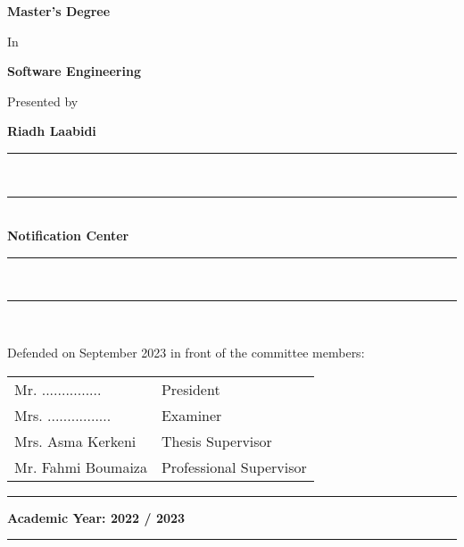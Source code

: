 \begin{titlepage}
\begin{center}
        \Large\textbf{Master's Degree}

        \normalsize In

        \Large\textbf{Software Engineering}

        \normalsize Presented by

        \large{\textbf{Riadh Laabidi}}
        \vspace{0.5cm}

        \rule[5pt]{0.5\textwidth}{0.5px}\\
        \vspace{-16px}
        \rule[10pt]{0.5\textwidth}{2.5px} \\
        \LARGE{\textbf{Notification Center}} \\
        \rule[5pt]{0.5\textwidth}{0.5px}\\
        \vspace{-15px}
        \rule[10pt]{0.5\textwidth}{2.5px} \\


        \vspace{1cm}

        \small Defended on September 2023 in front of the committee members:

        \renewcommand\arraystretch{1}
        \begin{tabular}{m{} l }
            Mr. ...............   & President               \\
            Mrs. ................ & Examiner                \\
            Mrs. Asma Kerkeni     & Thesis Supervisor       \\
            Mr. Fahmi Boumaiza    & Professional Supervisor
        \end{tabular}
    \end{center}

    \vfill
    \centering
    \rule[0.5px]{30px}{0.5px} \space \footnotesize \textbf{Academic Year: 2022 / 2023} \space \rule[0.5px]{30px}{0.5px}
\end{titlepage}
\cleardoublepage